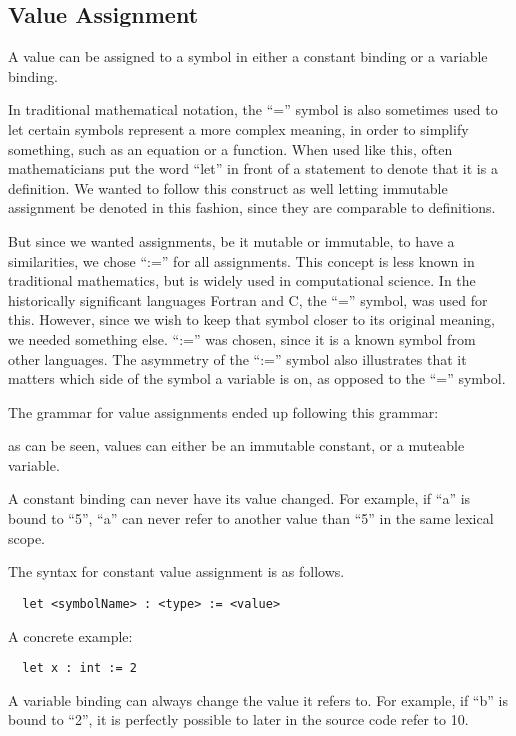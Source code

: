 \subsection{Value Assignment}
\label{subsec:value_assignment}

A value can be assigned to a symbol in either a constant binding or a variable binding.

In traditional mathematical notation, the \enquote{=} symbol is also sometimes used to let certain symbols represent a more complex meaning, in order to simplify something, such as an equation or a function. When used like this, often mathematicians put the word \enquote{let} in front of a statement to denote that it is a definition. We wanted to follow this construct as well letting immutable assignment be denoted in this fashion, since they are comparable to definitions. 

But since we wanted assignments, be it mutable or immutable, to have a similarities, we chose \enquote{:=} for all assignments. This concept is less known in traditional mathematics, but is widely used in computational science. In the historically significant languages Fortran and C, the \enquote{=} symbol, was used for this. However, since we wish to keep that symbol closer to its original meaning, we needed something else. \enquote{:=} was chosen, since it is a known symbol from other languages. The asymmetry of the \enquote{:=} symbol also illustrates that it matters which side of the symbol a variable is on, as opposed to the \enquote{=} symbol.

The grammar for value assignments ended up following this grammar:


as can be seen, values can either be an immutable constant, or a muteable variable.

A constant binding can never have its value changed. For example, if \enquote{a} is bound to \enquote{5}, \enquote{a} can never refer to another value than \enquote{5} in the same lexical scope. 

The syntax for constant value assignment is as follows.
\begin{verbatim}
  let <symbolName> : <type> := <value>
\end{verbatim}
A concrete example:

\begin{verbatim}
  let x : int := 2
\end{verbatim}

A variable binding can always change the value it refers to. For example, if \enquote{b} is bound to \enquote{2}, it is perfectly possible to later in the source code refer to {10}.

